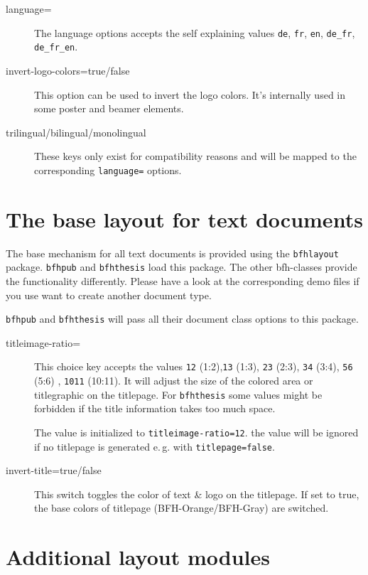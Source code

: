 \documentclass[
]{bfhpub}				%
\newcommand*{\pkg}[1]{\texttt{#1}}
\newcommand*{\cls}[1]{\texttt{#1}}
\newcommand*{\code}[1]{\texttt{#1}}
\begin{document}
\begin{description}
	\item[language=] The language options accepts the self explaining values \verb+de+, \verb+fr+, \verb+en+, \verb+de_fr+, \verb+de_fr_en+.
	\item[invert-logo-colors=true/false] This option can be used to invert the logo colors. It's internally used in some poster and beamer elements.
	\item[trilingual/bilingual/monolingual] These keys only exist for compatibility reasons and will be mapped to the corresponding \verb+language=+ options.
\end{description}

\section{The base layout for text documents}
The base mechanism for all text documents is provided using the \pkg{bfhlayout} package.
\cls{bfhpub} and \cls{bfhthesis} load this package. The other bfh-classes provide the functionality differently.
Please have a look at the corresponding demo files if you use want to create another document type.

\cls{bfhpub} and \cls{bfhthesis} will pass all their document class options to this package.
\begin{description}
	\item[titleimage-ratio=] This choice key accepts the values \code{12} (1:2),\code{13} (1:3), \code{23} (2:3), \code{34} (3:4), \code{56} (5:6) , \code{1011} (10:11).
	It will adjust the size of the colored area or titlegraphic on the titlepage.
	For \cls{bfhthesis} some values might be forbidden if the title information takes too much space.
	
	The value is initialized to \code{titleimage-ratio=12}. the value will be ignored if no titlepage is generated e.\,g. with \code{titlepage=false}.

	\item[invert-title=true/false] This switch toggles the color of text \& logo on the titlepage. If set to true, the base colors of titlepage (BFH-Orange/BFH-Gray) are switched.
\end{description}


\section{Additional layout modules}
\label{sec:bfhmodule}
\end{document}
